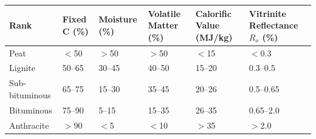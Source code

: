 \documentclass[11pt]{article}
\begin{document}
\begin{exemplebox}
\begin{center}
\begin{tabularx}{\linewidth}{|l|X|X|X|X|X|}
\hline
\rowcolor{popblueL} \textbf{Rank} & \textbf{Fixed C (\%)} & \textbf{Moisture (\%)} & \textbf{Volatile Matter (\%)} & \textbf{Calorific Value (MJ/kg)} & \textbf{Vitrinite Reflectance $R_o$ (\%)} \\
\hline
Peat & $<$50 & $>$50 & $>$50 & $<$15 & $<$0.3 \\
\hline
Lignite & 50--65 & 30--45 & 40--50 & 15--20 & 0.3--0.5 \\
\hline
Sub-bituminous & 65--75 & 15--30 & 35--45 & 20--26 & 0.5--0.65 \\
\hline
Bituminous & 75--90 & 5--15 & 15--35 & 26--35 & 0.65--2.0 \\
\hline
Anthracite & $>$90 & $<$5 & $<$10 & $>$35 & $>$2.0 \\
\hline
\end{tabularx}
\end{center}
\end{exemplebox}
\end{document}
